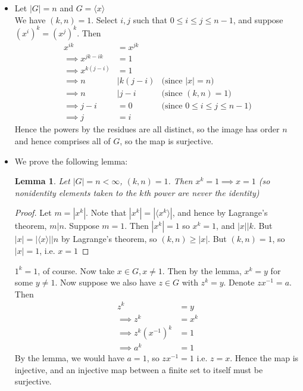 \documentclass{article}
\newcommand{\inv}[1]{ {#1}^{-1} }
\newcommand{\norm}[1]{|#1|}
\newcommand{\divides}{\big\vert}
\newcommand{\cyclic}[1]{\langle#1\rangle}
\newtheorem{lemma}[theorem]{Lemma}
\begin{document}
\subsubsection{}\label{ex3p25}
\begin{itemize} \label{ex3p25a}
\item Let $|G| = n$ and $G=\cyclic{x}$\\
We have $(k,n)=1$. Select $i,j$ such that $0\leq i \leq j \leq n-1$, and suppose $(x^i)^k = (x^j)^k$. Then
\begin{align*}
x^{ik} &= x^{jk}\\
\implies x^{jk - ik} &= 1\\
\implies x^{k(j - i)} &= 1\\
\implies n &\divides k(j-i) & \mbox{(since $\norm{x}=n$)}\\
\implies n &\divides j-i & \mbox{(since $(k,n)=1$)}\\
\implies j-i &= 0 & \mbox{(since $0\leq i \leq j \leq n-1$)}\\
\implies j &= i
\end{align*}
Hence the powers by the residues are all distinct, so the image has order $n$ and hence comprises all of $G$, so the map is surjective.
\item We prove the following lemma:
\begin{lemma} \label{lemma1}
Let $\norm{G} = n < \infty$, $(k,n)=1$. Then $x^k = 1 \implies x = 1$ (so nonidentity elements taken to the $k$th power are never the identity) 
\end{lemma}
\begin{proof}
Let $m = \norm{x^k}$. Note that $\norm{x^k}=\norm{\cyclic{x^k}}$, and hence by Lagrange's theorem, $m \divides n$. Suppose $m=1$. Then $\norm{x^k}=1$ so $x^k=1$, and $\norm{x} \divides k$. But $\norm{x} = \norm{\cyclic{x}} \divides n$ by Lagrange's theorem, so $(k,n) \geq \norm{x}$. But $(k,n)=1$, so $\norm{x} =1$, i.e. $x=1$
\end{proof}
$1^k =1$, of course. Now take $x \in G, x\neq 1$. Then by the lemma, $x^k = y$ for some $y \neq 1$. Now suppose we also have $z \in G$ with $z^k = y$. Denote $z\inv{x} = a$. Then
\begin{align*}
z^k &= y\\
\implies z^k &= x^k\\
\implies z^k(\inv{x})^k &= 1\\
\implies a^k &= 1
\end{align*}
By the lemma, we would have $a=1$, so $z\inv{x}=1$ i.e. $z=x$. Hence the map is injective, and an injective map between a finite set to itself must be surjective.
\end{itemize}
\end{document}
